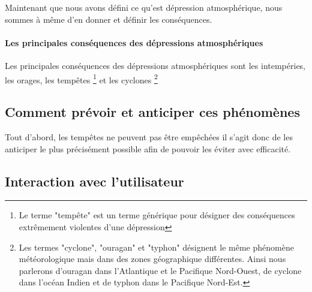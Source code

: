 \documentclass[12pt]{report}
\begin{document}
        Maintenant que nous avons défini ce qu'est dépression atmosphérique, nous sommes à même d'en donner et définir les conséquences.
        
        \paragraph{Les principales conséquences des dépressions atmosphériques}
        Les principales conséquences des dépressions atmosphériques sont les intempéries, les orages, les tempêtes \footnote{Le terme "tempête" est un terme générique pour désigner des conséquences extrêmement violentes d'une dépression} et les cyclones \footnote{Les termes "cyclone", "ouragan" et "typhon" désignent le même phénomène météorologique mais dans des zones géographique différentes. Ainsi nous parlerons d'ouragan dans l'Atlantique et le Pacifique Nord-Ouest, de cyclone dans l'océan Indien et de typhon dans le Pacifique Nord-Est.}
        
            
            
                
        \clearpage    
    \subsection{Comment prévoir et anticiper ces phénomènes}
        
        Tout d'abord, les tempêtes ne peuvent pas être empêchées il s'agit donc de les anticiper le plus précisément possible afin de pouvoir les éviter avec efficacité.
    
    
    \subsection{Interaction avec l'utilisateur}    

    \clearpage
\end{document}
